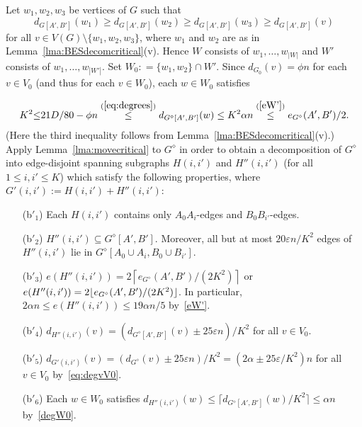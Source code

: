 \documentclass{memo-l}
\def\COMMENT#1{}
\def\eps{\varepsilon}
\numberwithin{section}{chapter}
\numberwithin{equation}{section}
\numberwithin{firstthm}{section}
\numberwithin{figure}{section}
\begin{document}
{Let $w_1, w_2, w_3$ be vertices of $G$ such that
$$d_{G[A',B']}(w_1) \ge d_{G[A',B']}(w_{2}) \ge d_{G[A',B']}(w_{3}) \ge d_{G[A',B']}(v)$$ for
all $v \in V(G) \setminus \{w_1,w_2,w_3\}$, where $w_1$ and $w_2$ are as in Lemma~\ref{lma:BESdecomcritical}(v).
Hence $W$ consists of $w_1, \dots, w_{|W|}$ and $W'$ consists of $w_1, \dots, w_{|W'|}$.
Set $W_0 : = \{w_1,w_2\} \cap W'$. Since $d_{G_0}(v)=\phi n$ for each $v\in V_0$ (and thus for each $v\in W_0$), each $w \in W_0$ satisfies%
\COMMENT{Previously, we had $15 K^2 \alpha n /38 \stackrel{(\ref{alphaeqD})}{\le} 21D/80-\phi n $, but the first inequality can be replaced by $K^2$,
as this is what we actually use in Lemma~\ref{lma:movecritical}}
\begin{align}
\label{degW0} 
K^2 {\le} 21D/80-\phi n \stackrel{(\ref{eq:degrees})}{\le}d_{G^{\diamond}[A',B']}(w) \le K^2 \alpha n \stackrel{(\ref{eW'})}{\le} e_{G^{\diamond}}(A',B')/2.
\end{align}
(Here the third inequality follows from Lemma~\ref{lma:BESdecomcritical}(v).)
Apply Lemma~\ref{lma:movecritical} to $G^{\diamond}$ in order to obtain a decomposition
of $G^{\diamond}$ into edge-disjoint spanning subgraphs $H(i,i')$ and $H''(i,i')$ (for all $1\le i,i' \le K$) which satisfy the following
properties, where $G'(i,i'):=H(i,i')+H''(i,i')$:
\begin{itemize}
\item[\rm (b$'_1$)] Each $H(i,i')$ contains only $A_0A_i$-edges and $B_0B_{i'}$-edges.
\item[\rm (b$'_2$)] $H''(i,i')\subseteq G^{\diamond}[A',B']$.
Moreover, all but at most  $20 \eps n/K^2$ edges of $H''(i,i')$ lie in $G^{\diamond}[A_0 \cup A_i, B_0 \cup B_{i'}]$.
\item[\rm (b$'_3$)] $e(H''(i,i')) =  2 \left\lceil e_{G^{\diamond}}(A',B') / (2 K^2) \right\rceil$ or $e(H''(i,i')) =  2 \lfloor e_{G^{\diamond}}(A',B') / \break (2 K^2) \rfloor$.
In particular, $2\alpha n \le e(H''(i,i')) \le 19 \alpha n /5$ by~\eqref{eW'}.
\item[\rm (b$'_4$)] $d_{H''(i,i')}(v )  =  ( d_{G^{\diamond}[A',B']}(v)  \pm 25 \eps n)/K^2$ for all $v \in V_0$.
\item[\rm (b$'_5$)] $d_{G'(i,i')}(v )  =  ( d_{G^\diamond}(v)  \pm 25 \eps n)/K^2=\left( 2 \alpha  \pm   25 \eps/K^2 \right) n$ for all $v \in V_0$ by~\eqref{eq:degvV0}.
\item[\rm (b$'_6$)] Each $w \in W_0$ satisfies $d_{H''(i,i')}(w) \le \lceil d_{G{^{\diamond}}[A',B']}(w) / K^2 \rceil \le \alpha n $ by~\eqref{degW0}.
\end{itemize}
}
\end{document}
